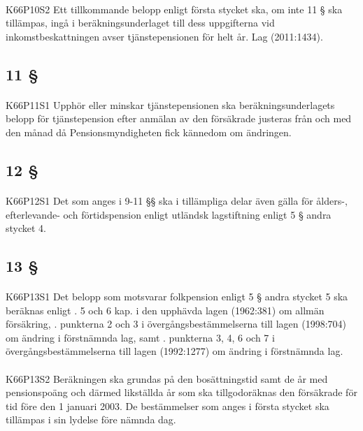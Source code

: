 \documentclass[a4paper,notitlepage,openany,10pt]{book}
\begin{document}
\paragraph*{}
{\tiny K66P10S2}
Ett tillkommande belopp enligt första stycket ska, om inte 11 § ska tillämpas, ingå i beräkningsunderlaget till dess uppgifterna vid inkomstbeskattningen avser tjänstepensionen för helt år.
Lag (2011:1434).
\subsection*{11 §}
\paragraph*{}
{\tiny K66P11S1}
Upphör eller minskar tjänstepensionen ska beräkningsunderlagets belopp för tjänstepension efter anmälan av den försäkrade justeras från och med den månad då Pensionsmyndigheten fick kännedom om ändringen.
\subsection*{12 §}
\paragraph*{}
{\tiny K66P12S1}
Det som anges i 9-11 §§ ska i tillämpliga delar även gälla för ålders-, efterlevande- och förtidspension enligt utländsk lagstiftning enligt 5 § andra stycket 4.
\subsection*{13 §}
\paragraph*{}
{\tiny K66P13S1}
Det belopp som motsvarar folkpension enligt 5 § andra stycket 5 ska beräknas enligt
. 5 och 6 kap. i den upphävda lagen (1962:381) om allmän försäkring,
. punkterna 2 och 3 i övergångsbestämmelserna till lagen (1998:704) om ändring i förstnämnda lag, samt
. punkterna 3, 4, 6 och 7 i övergångsbestämmelserna till lagen (1992:1277) om ändring i förstnämnda lag.
\paragraph*{}
{\tiny K66P13S2}
Beräkningen ska grundas på den bosättningstid samt de år med pensionspoäng och därmed likställda år som ska tillgodoräknas den försäkrade för tid före den 1 januari 2003. De bestämmelser som anges i första stycket ska tillämpas i sin lydelse före nämnda dag.
\end{document}
